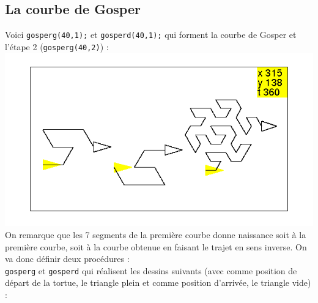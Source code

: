 \documentclass[a4paper,11pt]{book}
\begin{document}
\subsection{La courbe de Gosper}
Voici {\tt gosperg(40,1);} et {\tt  gosperd(40,1);} qui forment la courbe de 
Gosper et  l'\'etape 2 ({\tt gosperg(40,2)}) :\\
%
\includegraphics[width=\textwidth]{tortgosper}
On remarque que les 7 segments de la premi\`ere courbe donne naissance soit 
 \`a la premi\`ere courbe, soit \`a la courbe obtenue en faisant le
 trajet en sens inverse. On va donc d\'efinir deux proc\'edures :\\
{\tt gosperg} et {\tt gosperd} qui r\'ealisent les dessins suivants (avec comme
 position de d\'epart de la tortue, le triangle plein et comme position 
d'arriv\'ee, le triangle vide) :\\ 
%
\end{document}
